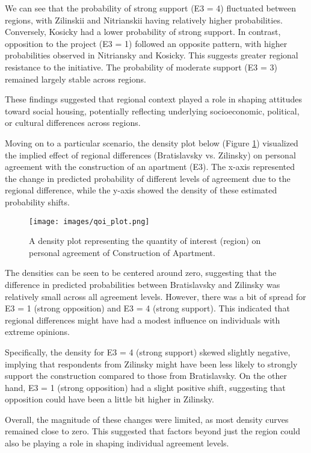 \documentclass[titlepage]{article}
\begin{document}
\justify
We can see that the probability of strong support (E3 = 4) fluctuated between regions, with Zilinskii and Nitrianskii having relatively higher probabilities. Conversely, Kosicky had a lower probability of strong support. In contrast, opposition to the project (E3 = 1) followed an opposite pattern, with higher probabilities observed in Nitriansky and Kosicky. This suggests greater regional resistance to the initiative. The probability of moderate support (E3 = 3) remained largely stable across regions.

\justify
These findings suggested that regional context played a role in shaping attitudes toward social housing, potentially reflecting underlying socioeconomic, political, or cultural differences across regions.

\justify
Moving on to a particular scenario, the density plot below (Figure \ref{fig:qoi}) visualized the implied effect of regional differences (Bratislavsky vs. Zilinsky) on personal agreement with the construction of an apartment (E3). The x-axis represented the change in predicted probability of different levels of agreement due to the regional difference, while the y-axis showed the density of these estimated probability shifts.

\begin{figure}[H]
    \centering
    \texttt{[image: images/qoi\_plot.png]}
    \caption{A density plot representing the quantity of interest (region) on personal agreement of Construction of Apartment.}
    \label{fig:qoi}
\end{figure}

\justify
The densities can be seen to be centered around zero, suggesting that the difference in predicted probabilities between Bratislavsky and Zilinsky was relatively small across all agreement levels. However, there was a bit of spread for E3 = 1 (strong opposition) and E3 = 4 (strong support). This indicated that regional differences might have had a modest influence on individuals with extreme opinions.

\justify
Specifically, the density for E3 = 4 (strong support) skewed slightly negative, implying that respondents from Zilinsky might have been less likely to strongly support the construction compared to those from Bratislavsky. On the other hand, E3 = 1 (strong opposition) had a slight positive shift, suggesting that opposition could have been a little bit higher in Zilinsky.

\justify
Overall, the magnitude of these changes were limited, as most density curves remained close to zero. This suggested that factors beyond just the region could also be playing a role in shaping individual agreement levels.
\end{document}

